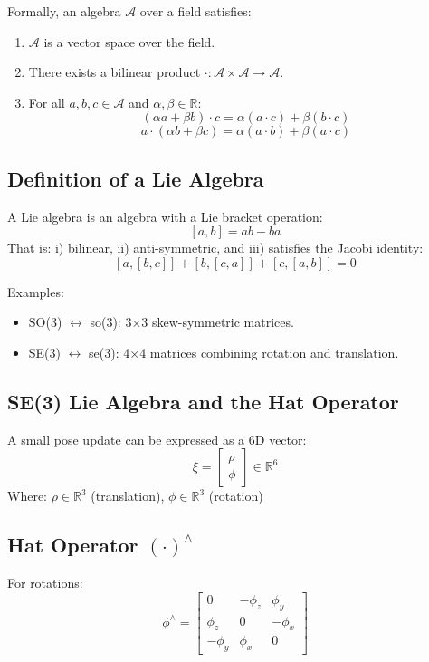 \documentclass[11pt,a4paper]{article}
\begin{document}
Formally, an algebra \( \mathcal{A} \) over a field satisfies:
\begin{enumerate}[label=\arabic*.]
    \item \( \mathcal{A} \) is a vector space over the field.
    \item There exists a bilinear product \( \cdot : \mathcal{A} \times \mathcal{A} \to \mathcal{A} \).
    \item For all \( a,b,c \in \mathcal{A} \) and \( \alpha, \beta \in \mathbb{R} \):
    \[
    (\alpha a + \beta b) \cdot c = \alpha (a \cdot c) + \beta (b \cdot c)
    \]
    \[
    a \cdot (\alpha b + \beta c) = \alpha (a \cdot b) + \beta (a \cdot c)
    \]
\end{enumerate}

\subsection*{Definition of a Lie Algebra}
A Lie algebra is an algebra with a Lie bracket operation:
\[
[a, b] = ab - ba
\]
That is: i) bilinear, ii) anti-symmetric, and iii) satisfies the Jacobi identity:
\[
[a,[b,c]] + [b,[c,a]] + [c,[a,b]] = 0
\]

Examples:
\begin{itemize}
    \item SO(3) $\leftrightarrow$ so(3): 3×3 skew-symmetric matrices.
    \item SE(3) $\leftrightarrow$ se(3): 4×4 matrices combining rotation and translation.
\end{itemize}

\subsection*{SE(3) Lie Algebra and the Hat Operator}

A small pose update can be expressed as a 6D vector:
\[
\xi =
\begin{bmatrix}
\rho \\ \phi
\end{bmatrix} \in \mathbb{R}^6
\]
Where: \( \rho \in \mathbb{R}^3 \) (translation), \( \phi \in \mathbb{R}^3 \) (rotation)

\subsection*{Hat Operator \( (\cdot)^\wedge \)}

For rotations:
\[
\phi^\wedge =
\begin{bmatrix}
0 & -\phi_z & \phi_y \\
\phi_z & 0 & -\phi_x \\
-\phi_y & \phi_x & 0
\end{bmatrix}
\]
\end{document}
